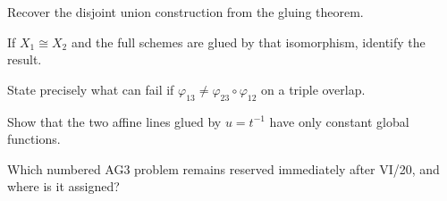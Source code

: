 \begin{exercise}\label{ex:vi20-22}
Recover the disjoint union construction from the gluing theorem.
\end{exercise}

\begin{exercise}\label{ex:vi20-23}
If $X_1\cong X_2$ and the full schemes are glued by that isomorphism, identify the result.
\end{exercise}

\begin{exercise}\label{ex:vi20-24}
State precisely what can fail if $\varphi_{13}\ne\varphi_{23}\circ\varphi_{12}$ on a triple overlap.
\end{exercise}

\begin{exercise}\label{ex:vi20-25}
Show that the two affine lines glued by $u=t^{-1}$ have only constant global functions.
\end{exercise}

\begin{exercise}\label{ex:vi20-26}
Which numbered AG3 problem remains reserved immediately after VI/20, and where is it assigned?
\end{exercise}

